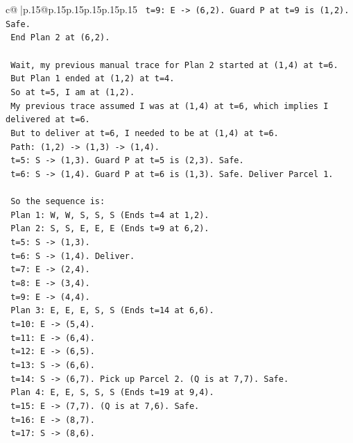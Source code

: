 \documentclass{article}
\begin{document}
{\begin{supertabular}{c@{$\;$}|p{.15\linewidth}@{}p{.15\linewidth}p{.15\linewidth}p{.15\linewidth}p{.15\linewidth}p{.15\linewidth}}
{{{\texttt{   t=9: E {-}> (6,2). Guard P at t=9 is (1,2). Safe.} \\
\texttt{   End Plan 2 at (6,2).} \\
\\ 
\texttt{   Wait, my previous manual trace for Plan 2 started at (1,4) at t=6.} \\
\texttt{   But Plan 1 ended at (1,2) at t=4.} \\
\texttt{   So at t=5, I am at (1,2).} \\
\texttt{   My previous trace assumed I was at (1,4) at t=6, which implies I delivered at t=6.} \\
\texttt{   But to deliver at t=6, I needed to be at (1,4) at t=6.} \\
\texttt{   Path: (1,2) {-}> (1,3) {-}> (1,4).} \\
\texttt{   t=5: S {-}> (1,3). Guard P at t=5 is (2,3). Safe.} \\
\texttt{   t=6: S {-}> (1,4). Guard P at t=6 is (1,3). Safe. Deliver Parcel 1.} \\
\\ 
\texttt{   So the sequence is:} \\
\texttt{   Plan 1: W, W, S, S, S (Ends t=4 at 1,2).} \\
\texttt{   Plan 2: S, S, E, E, E (Ends t=9 at 6,2).} \\
\texttt{     t=5: S {-}> (1,3).} \\
\texttt{     t=6: S {-}> (1,4). Deliver.} \\
\texttt{     t=7: E {-}> (2,4).} \\
\texttt{     t=8: E {-}> (3,4).} \\
\texttt{     t=9: E {-}> (4,4).} \\
\texttt{   Plan 3: E, E, E, S, S (Ends t=14 at 6,6).} \\
\texttt{     t=10: E {-}> (5,4).} \\
\texttt{     t=11: E {-}> (6,4).} \\
\texttt{     t=12: E {-}> (6,5).} \\
\texttt{     t=13: S {-}> (6,6).} \\
\texttt{     t=14: S {-}> (6,7). Pick up Parcel 2. (Q is at 7,7). Safe.} \\
\texttt{   Plan 4: E, E, S, S, S (Ends t=19 at 9,4).} \\
\texttt{     t=15: E {-}> (7,7). (Q is at 7,6). Safe.} \\
\texttt{     t=16: E {-}> (8,7).} \\
\texttt{     t=17: S {-}> (8,6).} \\
}}}
\end{supertabular}}
\end{document}
